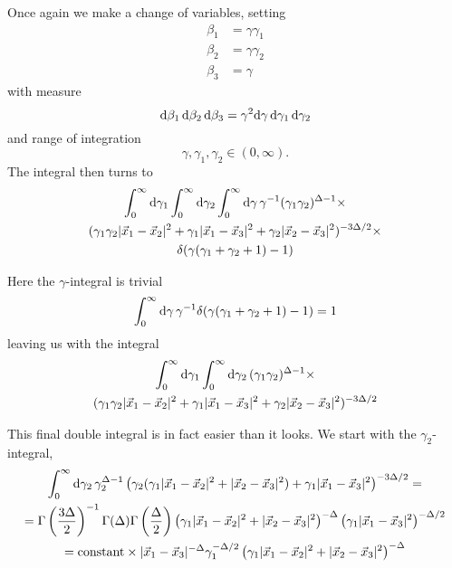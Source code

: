 Once again we make a change of variables, setting
\begin{align*}
\beta_1 &= \gamma \gamma_1 \\
\beta_2 &= \gamma \gamma_2 \\
\beta_3 &= \gamma
\end{align*}
with measure
$$\mathrm{d}\beta_1\, \mathrm{d}\beta_2\, \mathrm{d}\beta_3 = \gamma^2 \mathrm{d}\gamma\, \mathrm{d}\gamma_1\, \mathrm{d}\gamma_2$$
and range of integration
$$\gamma,\gamma_1,\gamma_2 \in (0,\infty).$$
The integral then turns to
\begin{multline*}
  \int_0^\infty \mathrm{d}\gamma_1
  \int_0^\infty \mathrm{d}\gamma_2
  \int_0^\infty \mathrm{d}\gamma\, \gamma^{-1} (\gamma_1 \gamma_2)^{\Delta-1} \times \\
    (\gamma_1 \gamma_2 |\vec{x}_1-\vec{x}_2|^2 +
     \gamma_1 |\vec{x}_1-\vec{x}_3|^2 +
     \gamma_2 |\vec{x}_2-\vec{x}_3|^2)^{-3\Delta/2} \times\\
    \delta(\gamma(\gamma_1+\gamma_2+1)-1)
\end{multline*}

Here the $\gamma$-integral is trivial
$$\int_0^\infty \mathrm{d}\gamma\, \gamma^{-1} \delta(\gamma(\gamma_1+\gamma_2+1)-1) = 1$$
leaving us with the integral
\begin{multline*}
\int_0^\infty \mathrm{d}\gamma_1 \int_0^\infty \mathrm{d}\gamma_2\,
  (\gamma_1 \gamma_2)^{\Delta-1} \times \\
    (\gamma_1 \gamma_2 |\vec{x}_1-\vec{x}_2|^2 +
     \gamma_1 |\vec{x}_1-\vec{x}_3|^2 +
     \gamma_2 |\vec{x}_2-\vec{x}_3|^2)^{-3\Delta/2}
\end{multline*}

This final double integral is in fact easier than it looks. We start with the $\gamma_2$-integral,
\begin{multline*}
\int_0^\infty \mathrm{d}\gamma_2\, \gamma_2^{\Delta-1} \left(\gamma_2(\gamma_1|\vec{x}_1-\vec{x}_2|^2+|\vec{x}_2-\vec{x}_3|^2) + \gamma_1|\vec{x}_1-\vec{x}_3|^2\right)^{-3\Delta/2} = \\
= \Gamma\left(\frac{3\Delta}{2}\right)^{-1} \Gamma(\Delta) \Gamma\left(\frac{\Delta}{2}\right) \left( \gamma_1 |\vec{x}_1-\vec{x}_2|^2 + |\vec{x}_2-\vec{x}_3|^2 \right)^{-\Delta} \left(\gamma_1 |\vec{x}_1-\vec{x}_3|^2\right)^{-\Delta/2} \\
= \text{constant} \times |\vec{x}_1-\vec{x}_3|^{-\Delta} \gamma_1^{-\Delta/2} \left( \gamma_1 |\vec{x}_1-\vec{x}_2|^2 + |\vec{x}_2-\vec{x}_3|^2 \right)^{-\Delta}
\end{multline*}


